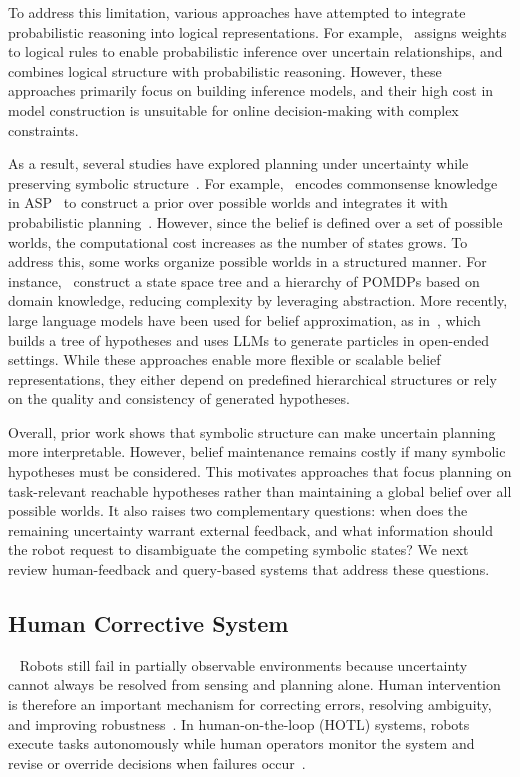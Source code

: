 To address this limitation, various approaches have attempted to integrate probabilistic reasoning into logical representations. For example,~\cite{richardson2006markov} assigns weights to logical rules to enable probabilistic inference over uncertain relationships, and~\cite{qu2019probabilistic} combines logical structure with probabilistic reasoning. However, these approaches primarily focus on building inference models, and their high cost in model construction is unsuitable for online decision-making with complex constraints. 


As a result, several studies have explored planning under uncertainty while preserving symbolic structure~\cite{li2026uncertainty,sanner2010symbolic}. For example,~\cite{zhang2015corpp} encodes commonsense knowledge in ASP~\cite{lifschitz2019answer} to construct a prior over possible worlds and integrates it with probabilistic planning~\cite{kurniawati2008sarsop}. However, since the belief is defined over a set of possible worlds, the computational cost increases as the number of states grows. To address this, some works organize possible worlds in a structured manner. For instance,~\cite{serrano2021knowledge} construct a state space tree and a hierarchy of POMDPs based on domain knowledge, reducing complexity by leveraging abstraction. More recently, large language models have been used for belief approximation, as in~\cite{tang2025tru}, which builds a tree of hypotheses and uses LLMs to generate particles in open-ended settings. While these approaches enable more flexible or scalable belief representations, they either depend on predefined hierarchical structures or rely on the quality and consistency of generated hypotheses.


Overall, prior work shows that symbolic structure can make uncertain planning more interpretable. However, belief maintenance remains costly if many symbolic hypotheses must be considered. This motivates approaches that focus planning on task-relevant reachable hypotheses rather than maintaining a global belief over all possible worlds. It also raises two complementary questions: when does the remaining uncertainty warrant external feedback, and what information should the robot request to disambiguate the competing symbolic states? We next review human-feedback and query-based systems that address these questions.



\subsection{Human Corrective System}~\label{rel:HCS}
Robots still fail in partially observable environments because uncertainty cannot always be resolved from sensing and planning alone. Human intervention is therefore an important mechanism for correcting errors, resolving ambiguity, and improving robustness~\cite{kelly2019hg,mandlekar2020human}. In human-on-the-loop (HOTL) systems, robots execute tasks autonomously while human operators monitor the system and revise or override decisions when failures occur~\cite{scharre2015introduction,nahavandi2017trusted}.

